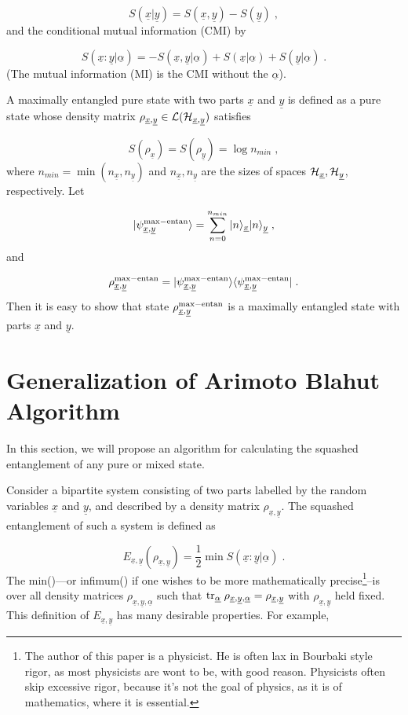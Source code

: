 \documentclass[12pt]{article}%
\newcommand{\bra}[1]{\langle#1|}
\newcommand{\ket}[1]{|#1\rangle}
\newcommand{\tr}[0]{{\rm tr }}
\newcommand{\beq}{\begin{equation}}
\newcommand{\eeq}{\end{equation}}
\newcommand{\ul}[1]{\underline{#1}}
\newcommand{\rvx}[0]{{\ul{x}}}
\newcommand{\rvy}[0]{{\ul{y}}}
\newcommand{\calh}[0]{{\cal H}}
\newcommand{\call}[0]{{\cal L}}
\newcommand{\rvalp}[0]{{\ul{\alpha}}}
\begin{document}
\beq
S(\rvx|\rvy) = S(\rvx, \rvy) - S(\rvy)
\;,
\eeq
and the conditional mutual information (CMI) by

\beq
S(\rvx : \rvy | \rvalp)=
-S(\rvx, \rvy| \rvalp)
+
S(\rvx| \rvalp)
+
S(\rvy| \rvalp)
\;.
\eeq
(The mutual information (MI) is the CMI without the $\rvalp$).


A maximally entangled pure state with two parts $\rvx$ and $\rvy$
is defined as a pure state whose density matrix $\rho_{\rvx,\rvy}\in \call({\calh_{\rvx, \rvy}})$
satisfies

\beq
S(\rho_\rvx)=S(\rho_\rvy)= \log n_{min}
\;,
\eeq
where $n_{min}=\min(n_\rvx, n_\rvy)$ and $n_\rvx, n_\rvy$
are the sizes of spaces $\calh_\rvx, \calh_\rvy$, respectively.
Let

\beq
\ket{\psi^{\rm max-entan}_{\rvx, \rvy}}=
\sum_{n=0}^{n_{min}}\ket{n}_\rvx\ket{n}_\rvy
\;,
\eeq
and

\beq
\rho^{\rm max-entan}_{\rvx, \rvy}=
\ket{\psi^{\rm max-entan}_{\rvx, \rvy}}
\bra{\psi^{\rm max-entan}_{\rvx, \rvy}}
\;.
\eeq
Then it is easy to show that
state $\rho^{\rm max-entan}_{\rvx, \rvy}$
is a maximally entangled state
with parts $\rvx$ and $\rvy$.





\section{Generalization of Arimoto Blahut Algorithm}
In this section, we will
propose an algorithm for
calculating the squashed entanglement
of any pure or mixed state.


Consider a bipartite system
consisting of two parts labelled
by the random variables $\rvx$ and $\rvy$,
and
described by a density matrix $\rho_{\rvx, \rvy}$.
The squashed entanglement of  such a system
is defined as

\beq
E_{\rvx, \rvy}(\rho_{\rvx, \rvy}) =
\frac{1}{2}
\min S(\rvx : \rvy|\rvalp)
\;.
\eeq
The min()---or infimum()
if one wishes to be more mathematically
precise\footnote{The author
of this paper is a physicist. He is
often lax in Bourbaki style rigor, as most physicists are wont to be,
with good reason.  Physicists often
 skip excessive rigor, because it's not the goal of physics,
 as it is of mathematics, where it is essential.}--is
over all density matrices $\rho_{\rvx, \rvy,\rvalp}$
such that $\tr_\rvalp \; \rho_{\rvx, \rvy,\rvalp}=
\rho_{\rvx, \rvy}$ with $\rho_{\rvx, \rvy}$ held fixed.
This definition of $E_{\rvx,\rvy}$
has many desirable properties. For example,
\end{document}

